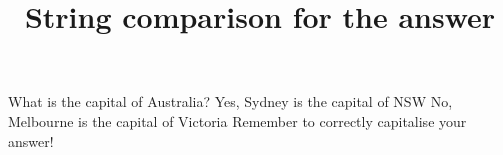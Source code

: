 \documentclass[hidesidemenu]{webquiz}
\title{String comparison for the answer}
\begin{document}
  \begin{question}     %
     What is the capital of Australia?
     \whenRight Yes, Sydney is the capital of NSW
     \whenWrong No, Melbourne is the capital of Victoria
     \whenWrong Remember to correctly capitalise your answer!
  \end{question}
\end{document}
